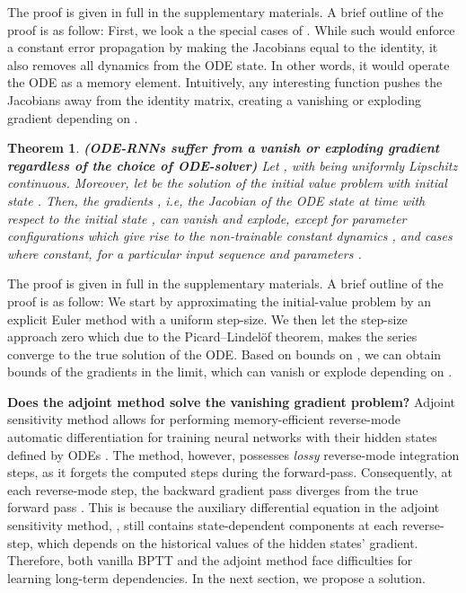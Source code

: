 \documentclass{article}
\newtheorem{theorem}{Theorem}
\begin{document}
The proof is given in full in the supplementary materials. A brief outline of the proof is as follow: 
First, we look a the special cases of . While such  would enforce a constant error propagation by making the Jacobians equal to the identity, it also removes all dynamics from the ODE state. In other words, it would operate the ODE as a memory element.
Intuitively, any interesting function  pushes the Jacobians away from the identity matrix, creating a vanishing or exploding gradient depending on .

\begin{theorem}
\label{thm:ode_solution}
\textbf{\emph{(ODE-RNNs suffer from a vanish or exploding gradient regardless of the choice of ODE-solver) }} 
    Let , with  being uniformly Lipschitz continuous. 
    Moreover, let  be the solution of the initial value problem with initial state .
    Then, the gradients , i.e, the Jacobian of the ODE state at time  with respect to the initial state , can vanish and explode, except for parameter configurations which give rise to the non-trainable constant dynamics , and cases where  constant, for a particular input sequence  and parameters .
\end{theorem}
The proof is given in full in the supplementary materials. A brief outline of the proof is as follow:
We start by approximating the initial-value problem by an explicit Euler method with a uniform step-size. 
We then let the step-size approach zero which due to the Picard–Lindelöf theorem, makes the series
converge to the true solution of the ODE.
Based on bounds on , we can obtain bounds of the gradients in the limit, which can vanish or explode depending on .

\textbf{Does the adjoint method solve the vanishing gradient problem?}
Adjoint sensitivity method \cite{pontryagin2018mathematical} allows for performing memory-efficient reverse-mode automatic differentiation for training neural networks with their hidden states defined by ODEs \cite{chen2018neural}. The method, however, possesses \emph{lossy} reverse-mode integration steps, as it forgets the computed steps during the forward-pass. Consequently, at each reverse-mode step, the backward gradient pass diverges from the true forward pass \cite{zhuang2020adaptive,gholami2019anode}. 
This is because the auxiliary differential equation in the adjoint sensitivity method, , still contains state-dependent components at each reverse-step, which depends on the historical values of the hidden states' gradient. Therefore, both vanilla BPTT and the adjoint method face difficulties for learning long-term dependencies. In the next section, we propose a solution. 
\end{document}
